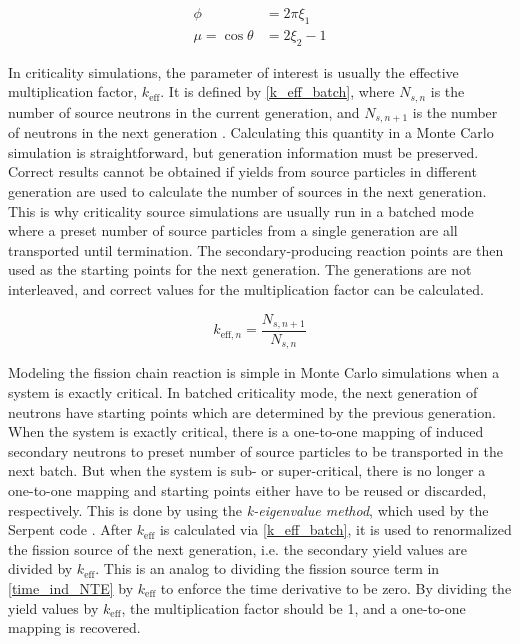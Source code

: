 \begin{equation}
\label{iso_samp}
\begin{split}
\phi &= 2 \pi \xi_1 \\
\mu= \cos \theta &= 2 \xi_2 -1
\end{split}
\end{equation}

In criticality simulations, the parameter of interest is usually the effective multiplication factor, $k_\mathrm{eff}$.  It is defined by \eqref{k_eff_batch}, where $N_{s,n}$ is the number of source neutrons in the current generation, and $N_{s,n+1}$ is the number of neutrons in the next generation \cite{jaakko}.  Calculating this quantity in a Monte Carlo simulation is straightforward, but generation information must be preserved.  Correct results cannot be obtained if yields from source particles in different generation are used to calculate the number of sources in the next generation.  This is why criticality source simulations are usually run in a batched mode where a preset number of source particles from a single generation are all transported until termination.  The secondary-producing reaction points are then used as the starting points for the next generation.  The generations are not interleaved, and correct values for the multiplication factor can be calculated.

\begin{equation}
\label{k_eff_batch}
k_{\mathrm{eff},n} = \frac{N_{s,n+1}}{N_{s,n}}
\end{equation}

Modeling the fission chain reaction is simple in Monte Carlo simulations when a system is exactly critical.  In batched criticality mode, the next generation of neutrons have starting points which are determined by the previous generation.  When the system is exactly critical, there is a one-to-one mapping of induced secondary neutrons to preset number of source particles to be transported in the next batch.  But when the system is sub- or super-critical, there is no longer a one-to-one mapping and starting points either have to be reused or discarded, respectively.  This is done by using the \emph{k-eigenvalue method}, which used by the Serpent code \cite{jaakko}.  After $k_\mathrm{eff}$ is calculated via \eqref{k_eff_batch}, it is used to renormalized the fission source of the next generation, i.e. the secondary yield values are divided by $k_\mathrm{eff}$.  This is an analog to dividing the fission source term in \eqref{time_ind_NTE} by $k_\mathrm{eff}$ to enforce the time derivative to be zero.  By dividing the yield values by $k_\mathrm{eff}$, the multiplication factor should be 1, and a one-to-one mapping is recovered.  

